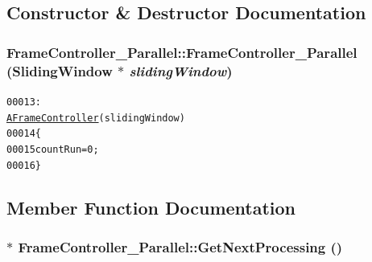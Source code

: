 \subsection{Constructor \& Destructor Documentation}
\hypertarget{class_frame_controller___parallel_a5e258e822b7cea0eb61e02b28a7f0db7}{
\subsubsection[{FrameController\_\-Parallel}]{\setlength{\rightskip}{0pt plus 5cm}FrameController\_\-Parallel::FrameController\_\-Parallel ({\bf SlidingWindow} $\ast$ {\em slidingWindow})}}
\label{class_frame_controller___parallel_a5e258e822b7cea0eb61e02b28a7f0db7}




\begin{footnotesize}\begin{alltt}
00013                                                                                : 
      \hyperlink{class_a_frame_controller_a448319ad03f91eebc5da7fdf8a43516c}{AFrameController}(slidingWindow)
00014 \{
00015         countRun = 0;
00016 \}
\end{alltt}\end{footnotesize}




\subsection{Member Function Documentation}
\hypertarget{class_frame_controller___parallel_a51792b5fe70db6d99be59c110dbc3041}{
\subsubsection[{GetNextProcessing}]{ $\ast$ FrameController\_\-Parallel::GetNextProcessing ()}}
\label{class_frame_controller___parallel_a51792b5fe70db6d99be59c110dbc3041}


